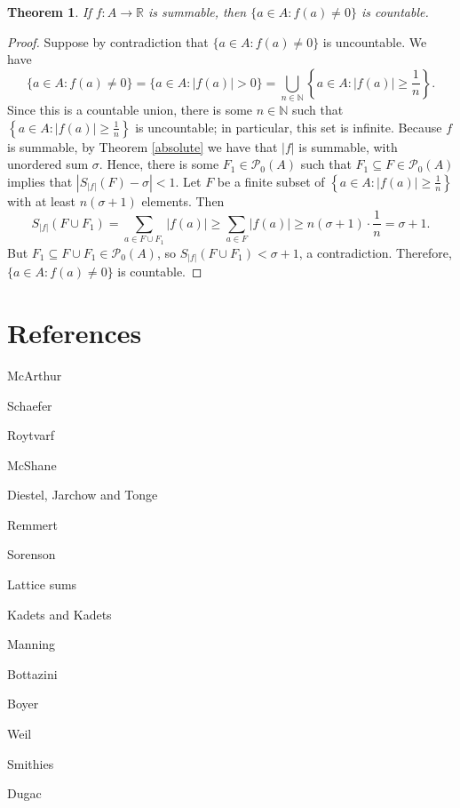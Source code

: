 \documentclass{article}
\newtheorem{theorem}{Theorem}
\begin{document}
\begin{theorem}
If $f:A \to \mathbb{R}$ is summable,
then $\{a \in A: f(a) \neq 0\}$ is countable.
\end{theorem}
\begin{proof}
Suppose by contradiction that $\{a \in A: f(a) \neq 0\}$ is uncountable. We have
\[
\{a \in A: f(a) \neq 0\}= \{a \in A: |f(a)|>0\} = \bigcup_{n \in \mathbb{N}} \left\{a \in A: |f(a)| \geq \frac{1}{n} \right\}.
\]
Since this is a countable union, there is some $n \in \mathbb{N}$ such that $\left\{ a \in A: |f(a)| \geq \frac{1}{n} \right\}$ is uncountable; in particular,
this set is infinite.
Because $f$ is summable, by Theorem \ref{absolute} we have that $|f|$ is summable, with unordered sum $\sigma$. Hence, there is 
some $F_1 \in \mathscr{P}_0(A)$ such that $F_1 \subseteq F \in \mathscr{P}_0(A)$ implies that $|S_{|f|}(F)-\sigma|<1$.
Let $F$ be a finite subset of $\left\{a \in A: |f(a)| \geq \frac{1}{n} \right\}$ with at least $n(\sigma+1)$ elements. Then
\[
S_{|f|}(F \cup F_1) = \sum_{a \in F \cup F_1} |f(a)| \geq \sum_{a \in F} |f(a)| \geq n(\sigma+1) \cdot \frac{1}{n}=\sigma+1.
\]
But $F_1 \subseteq F \cup F_1 \in \mathscr{P}_0(A)$, so $S_{|f|}(F \cup F_1) < \sigma+1$,  a contradiction. Therefore, 
$\{a \in A: f(a) \neq 0\}$ is countable. 
\end{proof}




\section{References}
McArthur \cite{MR0235336}

Schaefer \cite[p.~120]{schaefer}

Roytvarf \cite[p.~282]{roytvarf}

McShane \cite{mcshane}

Diestel, Jarchow and Tonge \cite{diestel}

Remmert \cite[p.~29]{remmert}

Sorenson \cite{MR2640720}

Lattice sums \cite{MR2807930}

Kadets and Kadets \cite{kadets}

Manning \cite{manning}

Bottazini \cite{bottazini}

Boyer \cite{boyer}

Weil \cite{weil}

Smithies \cite{MR863341}

Dugac \cite{dugac}
\end{document}
